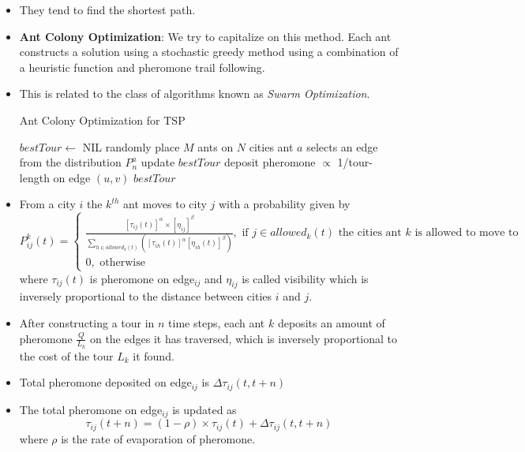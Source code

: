 \documentclass[a4paper]{article}
\begin{document}
\begin{itemize}
    \item They tend to find the shortest path.
    \item \textbf{Ant Colony Optimization}: We try to capitalize on this method. Each ant constructs a solution using a stochastic greedy method using a combination of a heuristic function and pheromone trail following.
    \item This is related to the class of algorithms known as \textit{Swarm Optimization}.
    \begin{algorithm}[H]
        \caption{Ant Colony Optimization for TSP}\label{alg:AI-ant-colony-tsp}
        \begin{algorithmic}[1]
            \Statex {}
            \State $bestTour\gets$ NIL
            \Repeat
                \State randomly place $M$ ants on $N$ cities
                        \State ant $a$ selects an edge from the distribution $P_n^a$
                    \EndFor
                \EndFor
                \State update $bestTour$
                        \State deposit pheromone $\propto$ 1/tour-length on edge $(u,v)$
                    \EndFor
                \EndFor
            \State \Return $bestTour$
        \end{algorithmic}
    \end{algorithm}
    \item From a city $i$ the $k^{th}$ ant moves to city $j$ with a probability given by
    \begin{equation*}
        P^k_{ij}(t)=\begin{cases}
            \frac{[\tau_{ij}(t)]^\alpha \times [\eta_{ij}]^\beta}{\sum_{h\in allowed_k(t)}([\tau_{ih}(t)]^\alpha [\eta_{ih}(t)]^\beta)},\text{ if }j\in allowed_k(t)\text{ the cities ant }k\text{ is allowed to move to}\\
            0,\text{ otherwise}
        \end{cases}
    \end{equation*}
    where $\tau_{ij}(t)$ is pheromone on edge$_{ij}$ and $\eta_{ij}$ is called visibility which is inversely proportional to the distance between cities $i$ and $j$.
    \item After constructing a tour in $n$ time steps, each ant $k$ deposits an amount of pheromone $\frac{Q}{L_k}$ on the edges it has traversed, which is inversely proportional to the cost of the tour $L_k$ it found.
    \item Total pheromone deposited on edge$_{ij}$ is $\Delta \tau_{ij}(t,t+n)$
    \item The total pheromone on edge$_{ij}$ is updated as
    \begin{equation*}
        \tau_{ij}(t+n)=(1-\rho)\times \tau_{ij}(t)+\Delta \tau_{ij}(t,t+n)
    \end{equation*}
    where $\rho$ is the rate of evaporation of pheromone.
\end{itemize}
\end{document}
